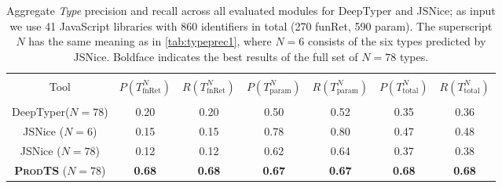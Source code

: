 \documentclass[sigplan,10pt,anonymous]{acmart} %
\newcommand{\prodts}{\textsc{ProdTS}\xspace}
\theoremstyle{plain}
\theoremstyle{remark}
\theoremstyle{definition}
\begin{document}
\begin{table*}[t]
  \centering
  \caption{Aggregate \textit{Type} precision and recall across all evaluated modules for DeepTyper and JSNice; as input we use 41 JavaScript libraries with 860 identifiers in total (270 funRet, 590 param).
    The superscript $N$ has the same meaning as in \cref{tab:typeprec1}, where $N = 6$ consists of the six types predicted by JSNice.
    Boldface indicates the best results of the full set of $N=78$ types.}\label{tab:typeprec2}
  \begin{tabular}{ccccccc}
    \toprule                                                                                                                                                                         \\
    Tool                             & $P(T^N_\text{fnRet})$ & $R(T^N_\text{fnRet})$ & $P(T^N_\text{param})$ & $R(T^N_\text{param})$ & $P(T^N_\text{total})$ & $R(T^N_\text{total})$ \\
    \midrule                                                                                                                                                                         \\
    DeepTyper\tiny{($N=78$)}         & 0.20                  & 0.20                  & 0.50                  & 0.52                  & 0.35                  & 0.36                  \\

    JSNice \tiny{($N=6$)}            & 0.15                  & 0.15                  & 0.78                  & 0.80                  & 0.47                  & 0.48                  \\
    JSNice \tiny{($N=78$)}           & 0.12                  & 0.12                  & 0.62                  & 0.64                  & 0.37                  & 0.38                  \\
    \textbf{\prodts} \tiny{($N=78$)} & \textbf{0.68}         & \textbf{0.68}         & \textbf{0.67}         & \textbf{0.67}
                                     & \textbf{0.68}         & \textbf{0.68}                                                                                                         \\
    \bottomrule
  \end{tabular}
\end{table*}
\end{document}
